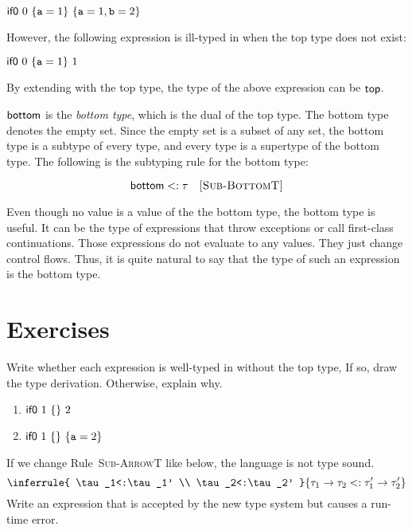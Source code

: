 $\textsf{if0}\ 0\ \{\texttt{a}=1\}\ \{\texttt{a}=1,\texttt{b}=2\}$

However, the following expression is ill-typed in \lang when the top type does
not exist:

$\textsf{if0}\ 0\ \{\texttt{a}=1\}\ 1$

By extending \lang with the top type, the type of the above expression can be
$\textsf{top}$.

$\textsf{bottom}$ is the \textit{bottom type}, which is the dual of
the top type. The bottom type denotes the empty set. Since the empty set is a subset of
any set, the bottom type is a subtype of every type, and
every type is a supertype of the bottom type. The following is the subtyping rule
for the bottom type:


\[
  \textsf{bottom}<:\tau
  \quad\textsc{[Sub-BottomT]}
\]

Even though no value is a value of the the bottom type,
the bottom type is useful. It can be the type of
expressions that throw exceptions or call first-class continuations. Those
expressions do not evaluate to any values. They just change control flows.
Thus, it is quite natural to say that the type of such an expression
is the bottom type.

\section{Exercises}

\begin{exercise}

Write whether each expression is well-typed in \lang without the top type,
If so, draw the type derivation. Otherwise, explain why.
\begin{enumerate}
\item $\textsf{if0}\ 1\ \{ \}\ 2$
\item $\textsf{if0}\ 1\ \{ \}\ \{\texttt{a}=2\}$
\end{enumerate}

\end{exercise}

\begin{exercise}

If we change Rule~\textsc{Sub-ArrowT} like below, the language is not type
  sound.
  \[
    \inferrule
    { \tau_1<:\tau_1' \\ \tau_2<:\tau_2' }
    { \tau_1\rightarrow\tau_2<:\tau_1'\rightarrow\tau_2' }
  \]
Write an expression that is accepted by the new type system but
causes a run-time error.

\end{exercise}


